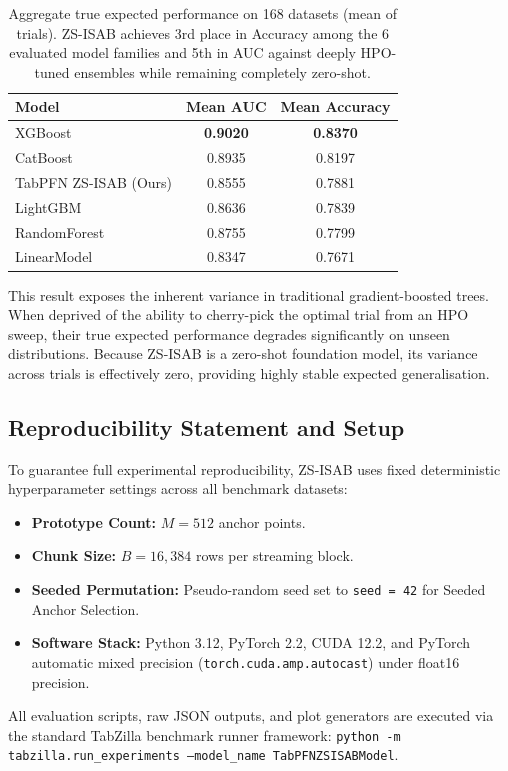 \documentclass[10pt]{article}
\begin{document}
\begin{table}[htbp]
\centering
\caption{Aggregate true expected performance on 168 datasets (mean of trials). ZS-ISAB achieves 3rd place in Accuracy among the 6 evaluated model families and 5th in AUC against deeply HPO-tuned ensembles while remaining completely zero-shot.}
\label{tab:aggregate}
\small
\begin{tabular}{@{}lcc@{}}
\toprule
\textbf{Model} & \textbf{Mean AUC} & \textbf{Mean Accuracy} \\
\midrule
XGBoost & \textbf{0.9020} & \textbf{0.8370} \\
CatBoost & 0.8935 & 0.8197 \\
TabPFN ZS-ISAB (Ours) & 0.8555 & 0.7881 \\
LightGBM & 0.8636 & 0.7839 \\
RandomForest & 0.8755 & 0.7799 \\
LinearModel & 0.8347 & 0.7671 \\
\bottomrule
\end{tabular}
\end{table}

This result exposes the inherent variance in traditional gradient-boosted trees. When deprived of the ability to cherry-pick the optimal trial from an HPO sweep, their true expected performance degrades significantly on unseen distributions. Because ZS-ISAB is a zero-shot foundation model, its variance across trials is effectively zero, providing highly stable expected generalisation.

\subsection{Reproducibility Statement and Setup}

To guarantee full experimental reproducibility, ZS-ISAB uses fixed deterministic hyperparameter settings across all benchmark datasets:
\begin{itemize}
    \item \textbf{Prototype Count:} $M = 512$ anchor points.
    \item \textbf{Chunk Size:} $B = 16{,}384$ rows per streaming block.
    \item \textbf{Seeded Permutation:} Pseudo-random seed set to \texttt{seed = 42} for Seeded Anchor Selection.
    \item \textbf{Software Stack:} Python 3.12, PyTorch 2.2, CUDA 12.2, and PyTorch automatic mixed precision (\texttt{torch.cuda.amp.autocast}) under float16 precision.
\end{itemize}
All evaluation scripts, raw JSON outputs, and plot generators are executed via the standard TabZilla benchmark runner framework: \texttt{python -m tabzilla.run\_experiments --model\_name TabPFNZSISABModel}.
\end{document}
